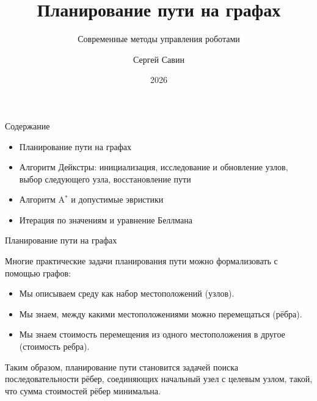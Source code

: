 \documentclass{beamer}
\subtitle{Современные методы управления роботами}
\author{Сергей Савин}
\date{2026}
\title{Планирование пути на графах}
\begin{document}
	\maketitle
	
	
	\begin{frame}{Содержание}
		\begin{itemize}
			\item Планирование пути на графах
			\item Алгоритм Дейкстры: инициализация, исследование и обновление узлов, выбор следующего узла, восстановление пути
			\item Алгоритм A$^\ast$ и допустимые эвристики
			\item Итерация по значениям и уравнение Беллмана
		\end{itemize}
	\end{frame}
	
	
	\begin{frame}{Планирование пути на графах}
		\begin{flushleft}
			
			Многие практические задачи планирования пути можно
			формализовать с помощью графов:
			
			\begin{itemize}
				\item Мы описываем среду как набор
				местоположений (узлов).
				\item Мы знаем, между какими местоположениями можно
				перемещаться (рёбра).
				\item Мы знаем стоимость перемещения из одного
				местоположения в другое (стоимость ребра).
			\end{itemize}
			
			Таким образом, планирование пути становится задачей поиска
			последовательности рёбер, соединяющих начальный узел
			с целевым узлом, такой, что сумма стоимостей рёбер
			минимальна.
			
		\end{flushleft}
	\end{frame}
	
\end{document}
